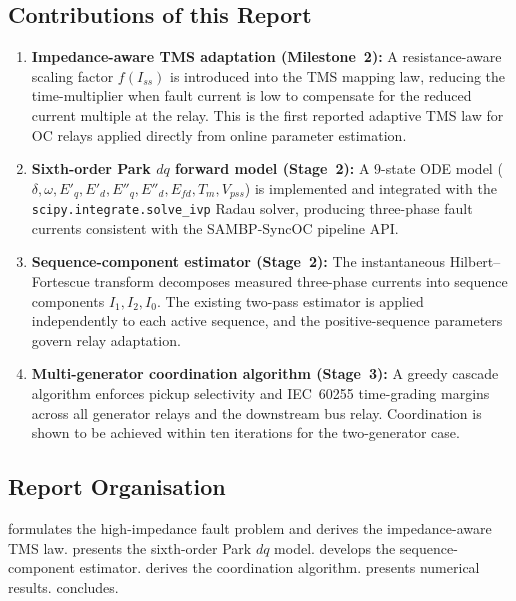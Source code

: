 \documentclass[12pt,a4paper]{article}
\theoremstyle{definition}
\theoremstyle{plain}
\begin{document}
\subsection{Contributions of this Report}
\label{sec:intro:contributions}

\begin{enumerate}
  \item \textbf{Impedance-aware TMS adaptation (Milestone~2):} A
        resistance-aware scaling factor $f(I_{ss})$ is introduced into the
        TMS mapping law, reducing the time-multiplier when fault current
        is low to compensate for the reduced current multiple at the relay.
        This is the first reported adaptive TMS law for OC relays applied
        directly from online parameter estimation.

  \item \textbf{Sixth-order Park $dq$ forward model (Stage~2):} A
        9-state ODE model ($\delta, \omega, E'_q, E'_d, E''_q, E''_d,
        E_{fd}, T_m, V_{pss}$) is implemented and integrated with the
        \texttt{scipy.integrate.solve\_ivp} Radau solver, producing
        three-phase fault currents consistent with the SAMBP-SyncOC
        pipeline API.

  \item \textbf{Sequence-component estimator (Stage~2):} The instantaneous
        Hilbert--Fortescue transform decomposes measured three-phase currents
        into sequence components $I_1, I_2, I_0$.  The existing two-pass
        estimator is applied independently to each active sequence, and the
        positive-sequence parameters govern relay adaptation.

  \item \textbf{Multi-generator coordination algorithm (Stage~3):} A greedy
        cascade algorithm enforces pickup selectivity and IEC~60255 time-grading
        margins across all generator relays and the downstream bus relay.
        Coordination is shown to be achieved within ten iterations for the
        two-generator case.
\end{enumerate}

\subsection{Report Organisation}
\label{sec:intro:organisation}

 formulates the high-impedance fault problem and derives the
impedance-aware TMS law.   presents the sixth-order Park $dq$
model.   develops the sequence-component estimator.
 derives the coordination algorithm.  
presents numerical results.   concludes.
\end{document}
